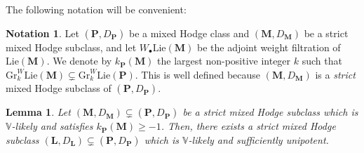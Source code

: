 \documentclass[10pt]{article}
\numberwithin{equation}{subsection}
\theoremstyle{plain}
\newtheorem{lemma}[theorem]{Lemma}
\theoremstyle{definition}
\newtheorem{notation}[theorem]{Notation}
\theoremstyle{remark}
\newcommand{\lie}{\mathrm{Lie}}
\newcommand{\Z}{\mathbb Z}
\newcommand{\C}{\mathbb C}
\newcommand{\V}{\mathbb V}
\newcommand{\pp}{\mathbf P}
\newcommand{\M}{\mathbf M}
\newcommand{\LL}{\mathbf L}
\newcommand{\bul}{\bullet}
\newcommand{\para}{\mathfrak{p}}
\newcommand{\mt}{\mathfrak{m}}
\newcommand{\Gr}{\mathrm{Gr}}
\begin{document}
The following notation will be convenient:
\begin{notation}
Let $(\pp, D_\pp)$ be a mixed Hodge class and $(\M, D_\M)$ be a strict mixed Hodge subclass, and let $W_\bul \lie(\M)$ be the adjoint weight filtration of $\lie(\M)$. We denote by $k_\pp(\M)$ the largest non-positive integer $k$ such that $\Gr^{W}_{k} \lie(\M) \subsetneq \Gr^{W}_{k} \lie(\pp)$. This is well defined because $(\M,D_\M)$ is a \textit{strict} mixed Hodge subclass of $(\pp, D_\pp)$.
\end{notation}
\begin{lemma}\label{minusone}
Let $(\M,D_\M) \subsetneq (\pp, D_\pp)$ be a strict mixed Hodge subclass which is $\V$-likely and satisfies $k_\pp(\M) \geqslant -1$. Then, there exists a strict mixed Hodge subclass $(\LL, D_\LL) \subsetneq (\pp, D_\pp)$ which is $\V$-likely and sufficiently unipotent.
\end{lemma}
\end{document}
